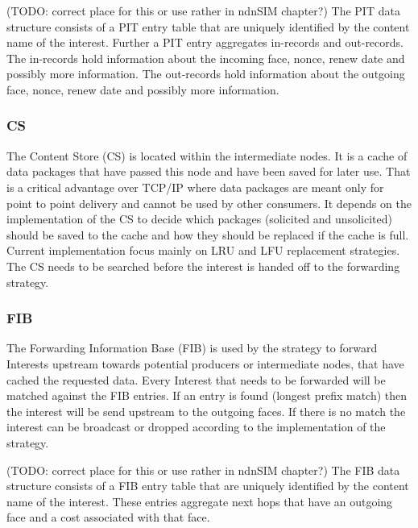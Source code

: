 \vspace{5mm} %

(TODO: correct place for this or use rather in ndnSIM chapter?) The PIT data structure consists of a PIT entry table that are uniquely identified by the content name of the interest. Further a PIT entry aggregates in-records and out-records. The in-records hold information about the incoming face, nonce, renew date and possibly more information. The out-records hold information about the outgoing face, nonce, renew date and possibly more information.

\subsubsection{CS} 

The Content Store (CS) is located within the intermediate nodes. It is a cache of data packages that have passed this node and have been saved for later use. That is a critical advantage over TCP/IP where data packages are meant only for point to point delivery and cannot be used by other consumers. It depends on the implementation of the CS to decide which packages (solicited and unsolicited) should be saved to the cache and how they should be replaced if the cache is full. Current implementation focus mainly on LRU and LFU replacement strategies. The CS needs to be searched before the interest is handed off to the forwarding strategy.

\subsubsection{FIB}

The Forwarding Information Base (FIB) is used by the strategy to forward Interests upstream towards potential producers or intermediate nodes, that have cached the requested data. Every Interest that needs to be forwarded will be matched against the FIB entries. If an entry is found (longest prefix match) then the interest will be send upstream to the outgoing faces. If there is no match the interest can be broadcast or dropped according to the implementation of the strategy.

\vspace{5mm} %

(TODO: correct place for this or use rather in ndnSIM chapter?) The FIB data structure consists of a FIB entry table that are uniquely identified by the content name of the interest. These entries aggregate next hops that have an outgoing face and a cost associated with that face.

